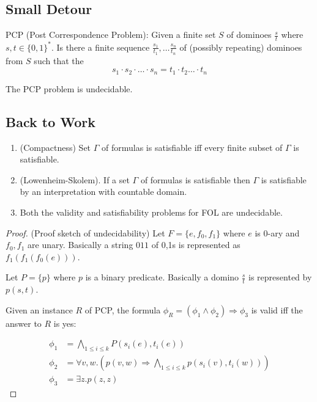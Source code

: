 \subsection{Small Detour}
PCP (Post Correspondence Problem): Given a finite set $S$ of dominoes $\frac{s}{t}$ where $s,t \in \{0,1\}^*$. Is there a finite sequence $\frac{s_1}{t_1}, \dots \frac{s_n}{t_n}$ of (possibly repeating) dominoes from $S$ such that the 
$$s_1 \cdot s_2 \cdot \dots \cdot s_n = t_1 \cdot t_2 \dots \cdot t_n$$

\begin{theorem}
    The PCP problem is undecidable.
\end{theorem}


\subsection{Back to Work}
\begin{metatheorem} 
    \begin{enumerate}
        \item (Compactness) Set $\Gamma$ of formulas is satisfiable iff every finite subset of $\Gamma$ is satisfiable.
        \item (Lowenheim-Skolem). If a set $\Gamma$ of formulas is satisfiable then $\Gamma$ is satisfiable by an interpretation with countable domain. 
        \item Both the validity and satisfiability problems for FOL are undecidable.
    \end{enumerate}
\end{metatheorem}
\begin{proof}
    (Proof sketch of undecidability) Let $F = \{e,f_0, f_1\}$ where $e$ is 0-ary and $f_0,f_1$ are unary. Basically a string $011$ of 0,1s is represented as $f_1(f_1(f_0(e)))$.  

    Let $P = \{p\}$ where $p$ is a binary predicate. Basically a domino $\frac{s}{t}$ is represented by $p(s,t)$. 

    Given an instance $R$ of PCP, the formula $\phi_R = (\phi_1 \wedge \phi_2) \Rightarrow \phi_3$ is valid iff the answer to $R$ is yes:

    \[
    \begin{split}
        \phi_1 &= \bigwedge_{1 \leq i \leq k} P(s_i(e), t_i(e)) \\
        \phi_2 &= \forall v,w. (p(v,w) \Rightarrow \bigwedge_{1 \leq i \leq k} p(s_i(v), t_i(w))) \\ 
        \phi_3 &= \exists z. p(z,z)
    \end{split}
    \]
\end{proof}
